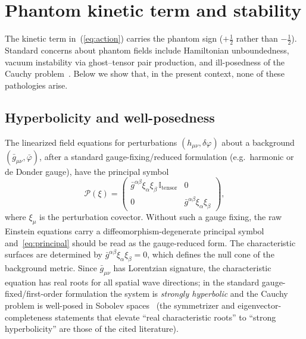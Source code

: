 \documentclass[aps,prd,onecolumn,superscriptaddress,nofootinbib,showpacs,12pt]{revtex4-2}
\newcommand{\half}{\tfrac{1}{2}}
\begin{document}
\section{Phantom kinetic term and stability}\label{sec:phantom}

The kinetic term in~(\ref{eq:action}) carries the phantom
sign ($+\half$ rather than $-\half$).  Standard concerns
about phantom fields include Hamiltonian unboundedness,
vacuum instability via ghost--tensor pair production,
and ill-posedness of the Cauchy
problem~\cite{Carroll2003,Cline2004,Sbisa2015}.
Below we show that, in the present context, none of
these pathologies arise.

\subsection{Hyperbolicity and well-posedness}
\label{sec:hyperbolicity}

The linearized field equations for perturbations
$(h_{\mu\nu},\delta\varphi)$ about a background
$(\bar{g}_{\mu\nu},\bar{\varphi})$, after a standard
gauge-fixing/reduced formulation (e.g.\ harmonic or de Donder
gauge), have the principal symbol
\begin{equation}\label{eq:principal}
  \mathcal{P}(\xi) =
  \begin{pmatrix}
    \bar{g}^{\alpha\beta}\xi_{\alpha}\xi_{\beta}\,
    \mathbb{I}_{\mathrm{tensor}} & 0 \\
    0 & \bar{g}^{\alpha\beta}\xi_{\alpha}\xi_{\beta}
  \end{pmatrix},
\end{equation}
where $\xi_{\mu}$ is the perturbation covector.  Without such
a gauge fixing, the raw Einstein equations carry a
diffeomorphism-degenerate principal symbol and~\eqref{eq:principal}
should be read as the gauge-reduced form.  The characteristic
surfaces are determined by
$\bar{g}^{\alpha\beta}\xi_{\alpha}\xi_{\beta} = 0$,
which defines the null cone of the background metric.
Since $\bar{g}_{\mu\nu}$ has Lorentzian signature, the
characteristic equation has real roots for all spatial
wave directions; in the standard gauge-fixed/first-order
formulation the system is \emph{strongly hyperbolic}
and the Cauchy problem is well-posed in Sobolev
spaces~\cite{Papallo2018,Kovacs2020} (the symmetrizer and
eigenvector-completeness statements that elevate ``real
characteristic roots'' to ``strong hyperbolicity'' are those
of the cited literature).
\end{document}
